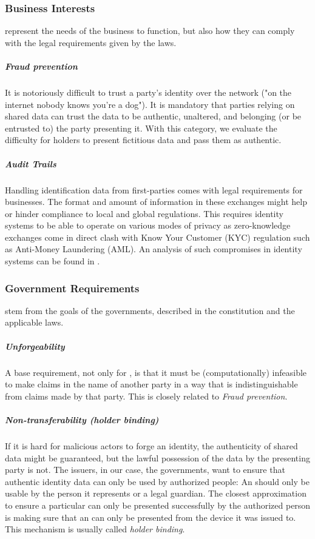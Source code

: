 \subsubsection{Business Interests} represent the needs of the business to function, but also how they can comply with the legal requirements given by the laws.

\subparagraph{Fraud prevention} It is notoriously difficult to trust a party's identity over the network ("on the internet nobody knows you're a dog"). It is mandatory that parties relying on shared data can trust the data to be authentic, unaltered, and belonging (or be entrusted to) the party presenting it. With this category, we evaluate the difficulty for holders to present fictitious data and pass them as authentic.

\subparagraph{Audit Trails} Handling identification data from first-parties comes with legal requirements for businesses. The format and amount of information in these exchanges might help or hinder compliance to local and global regulations. This requires identity systems to be able to operate on various modes of privacy as zero-knowledge exchanges come in direct clash with Know Your Customer (KYC) regulation such as Anti-Money Laundering (AML). An analysis of such compromises in identity systems can be found in \cite{ABCD25}.

\subsubsection{Government Requirements} stem from the goals of the governments, described in the constitution and the applicable laws.

\subparagraph{Unforgeability} A base requirement, not only for \eid, is that it must be (computationally) infeasible to make claims in the name of another party in a way that is indistinguishable from claims made by that party. This is closely related to \emph{Fraud prevention}.

\subparagraph{Non-transferability (holder binding)} If it is hard for malicious actors to forge an identity, the authenticity of shared data might be guaranteed, but the lawful possession of the data by the presenting party is not. The issuers, in our case, the governments, want to ensure that authentic identity data can only be used by authorized people: An \eid should only be usable by the person it represents or a legal guardian. The closest approximation to ensure a particular \eid can only be presented successfully by the authorized person is making sure that an \eid can only be presented from the device it was issued to. This mechanism is usually called \emph{holder binding}.

